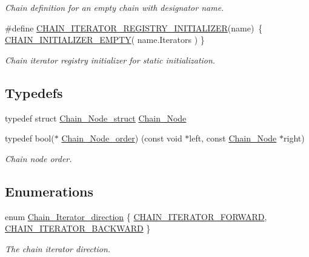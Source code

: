 \begin{DoxyCompactItemize}
\begin{DoxyCompactList}\small\item\em Chain definition for an empty chain with designator {\itshape name}. \end{DoxyCompactList}\item 
\#define \mbox{\hyperlink{group__RTEMSScoreChain_ga741b11fcd4a553695d5e90734b1b7dda}{C\+H\+A\+I\+N\+\_\+\+I\+T\+E\+R\+A\+T\+O\+R\+\_\+\+R\+E\+G\+I\+S\+T\+R\+Y\+\_\+\+I\+N\+I\+T\+I\+A\+L\+I\+Z\+ER}}(name)~\{ \mbox{\hyperlink{group__RTEMSScoreChain_ga837c307db69277bfb97d3ed4c22bc420}{C\+H\+A\+I\+N\+\_\+\+I\+N\+I\+T\+I\+A\+L\+I\+Z\+E\+R\+\_\+\+E\+M\+P\+TY}}( name.\+Iterators ) \}
\begin{DoxyCompactList}\small\item\em Chain iterator registry initializer for static initialization. \end{DoxyCompactList}\end{DoxyCompactItemize}
\subsection*{Typedefs}
\begin{DoxyCompactItemize}
\item 
typedef struct \mbox{\hyperlink{structChain__Node__struct}{Chain\+\_\+\+Node\+\_\+struct}} \mbox{\hyperlink{group__RTEMSScoreChain_ga0dd4bfcca1ac7f90de2842e447846d3d}{Chain\+\_\+\+Node}}
\item 
typedef bool($\ast$ \mbox{\hyperlink{group__RTEMSScoreChain_gae0cd0f9e8aa8b188cc3abed0fc77b9e7}{Chain\+\_\+\+Node\+\_\+order}}) (const void $\ast$left, const \mbox{\hyperlink{group__RTEMSScoreChain_ga0dd4bfcca1ac7f90de2842e447846d3d}{Chain\+\_\+\+Node}} $\ast$right)
\begin{DoxyCompactList}\small\item\em Chain node order. \end{DoxyCompactList}\end{DoxyCompactItemize}
\subsection*{Enumerations}
\begin{DoxyCompactItemize}
\item 
enum \mbox{\hyperlink{group__RTEMSScoreChain_gac754c64a6c8a46b7b17cf3b7ac33124b}{Chain\+\_\+\+Iterator\+\_\+direction}} \{ \mbox{\hyperlink{group__RTEMSScoreChain_ggac754c64a6c8a46b7b17cf3b7ac33124bae062fa85fc28744b9f002d6090eb5546}{C\+H\+A\+I\+N\+\_\+\+I\+T\+E\+R\+A\+T\+O\+R\+\_\+\+F\+O\+R\+W\+A\+RD}}, 
\mbox{\hyperlink{group__RTEMSScoreChain_ggac754c64a6c8a46b7b17cf3b7ac33124ba7d6fd42b19be8776d42613c33b731e91}{C\+H\+A\+I\+N\+\_\+\+I\+T\+E\+R\+A\+T\+O\+R\+\_\+\+B\+A\+C\+K\+W\+A\+RD}}
 \}
\begin{DoxyCompactList}\small\item\em The chain iterator direction. \end{DoxyCompactList}\end{DoxyCompactItemize}
